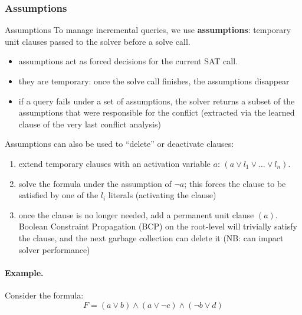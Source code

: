 \documentclass[a4paper, 11pt]{report}
\begin{document}
\subsubsection{Assumptions}
\begin{defframe}{Assumptions}{}
To manage incremental queries, we use \textbf{assumptions}: temporary unit clauses passed to the solver before a solve call. 
\begin{itemize}
    \item assumptions act as forced decisions for the current SAT call.
    \item they are temporary: once the solve call finishes, the assumptions disappear
    \item if a query fails under a set of assumptions, the solver returns a subset of the assumptions that were responsible for the conflict (extracted via the learned clause of the very last conflict analysis)
\end{itemize}
\end{defframe}

Assumptions can also be used to ``delete'' or deactivate clauses:
\vspace{-0.5em}
\begin{enumerate}
    \item extend temporary clauses with an activation variable $a$: $(a \vee l_1 \vee \dots \vee l_n)$.
    \item solve the formula under the assumption of $\neg a$; this forces the clause to be satisfied by one of the $l_i$ literals (activating the clause)
    \item once the clause is no longer needed, add a permanent unit clause $(a)$. Boolean Constraint Propagation (BCP) on the root-level will trivially satisfy the clause, and the next garbage collection can delete it (NB: can impact solver performance)
\end{enumerate}

\paragraph{Example.}
Consider the formula:
$$ F = (a \vee b) \wedge (a \vee \neg c) \wedge (\neg b \vee d) $$
\end{document}
